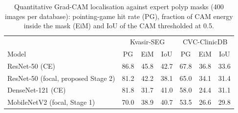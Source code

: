 \begin{table}[t]
\caption{Quantitative Grad-CAM localisation against expert polyp masks (400 images per database): pointing-game
hit rate (PG), fraction of CAM energy inside the mask (EiM) and IoU of the CAM thresholded at 0.5.}
\label{tab:gradcam}\centering\setlength{\tabcolsep}{2.6pt}
\begin{tabular}{lcccccc}\toprule
 & \multicolumn{3}{c}{Kvasir-SEG} & \multicolumn{3}{c}{CVC-ClinicDB}\\
Model & PG & EiM & IoU & PG & EiM & IoU\\\midrule
ResNet-50 (CE) & 86.8 & 45.8 & 42.7 & 67.8 & 36.8 & 33.6\\
ResNet-50 (focal, proposed Stage 2) & 81.2 & 42.2 & 38.1 & 65.0 & 34.1 & 31.4\\
DenseNet-121 (CE) & 81.8 & 31.7 & 41.0 & 58.0 & 24.4 & 31.1\\
MobileNetV2 (focal, Stage 1) & 70.0 & 38.9 & 40.7 & 53.5 & 26.6 & 29.8\\
\bottomrule\end{tabular}\end{table}
